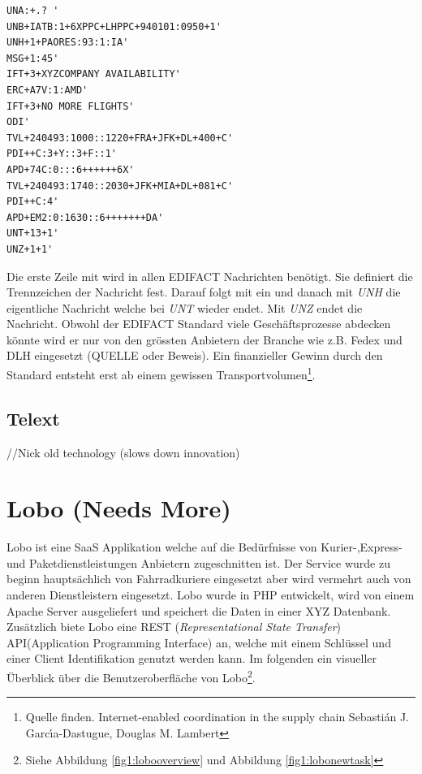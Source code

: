 \begin{verbatim}
UNA:+.? '
UNB+IATB:1+6XPPC+LHPPC+940101:0950+1'
UNH+1+PAORES:93:1:IA'
MSG+1:45'
IFT+3+XYZCOMPANY AVAILABILITY'
ERC+A7V:1:AMD'
IFT+3+NO MORE FLIGHTS'
ODI'
TVL+240493:1000::1220+FRA+JFK+DL+400+C'
PDI++C:3+Y::3+F::1'
APD+74C:0:::6++++++6X'
TVL+240493:1740::2030+JFK+MIA+DL+081+C'
PDI++C:4'
APD+EM2:0:1630::6+++++++DA'
UNT+13+1'
UNZ+1+1'
\end{verbatim}
Die erste Zeile mit  wird in allen EDIFACT Nachrichten benötigt. Sie definiert die Trennzeichen der Nachricht fest. Darauf folgt mit  ein  und danach mit \textit{UNH} die eigentliche Nachricht welche bei \textit{UNT} wieder endet. Mit \textit{UNZ} endet die Nachricht.
\newline{}
Obwohl der EDIFACT Standard viele Geschäftsprozesse abdecken könnte wird er nur von den grössten Anbietern der Branche wie z.B. Fedex und DLH eingesetzt (QUELLE oder Beweis). Ein finanzieller Gewinn durch den Standard entsteht erst ab einem gewissen Transportvolumen\footnote{Quelle finden. Internet-enabled coordination in the supply chain Sebastián J. Garcı́a-Dastugue, Douglas M. Lambert}.

\subsection{Telext}
//Nick old technology (slows down innovation)


\section{Lobo (Needs More)}
Lobo ist eine SaaS Applikation welche auf die Bedürfnisse von Kurier-,Express- und Paketdienstleistungen Anbietern zugeschnitten ist. Der Service wurde zu beginn hauptsächlich von Fahrradkuriere eingesetzt aber wird vermehrt auch von anderen Dienstleistern eingesetzt. Lobo wurde in PHP entwickelt, wird von einem Apache Server ausgeliefert und speichert die Daten in einer XYZ Datenbank. Zusätzlich biete Lobo eine REST (\textit{Representational State Transfer}) API(Application Programming Interface) an, welche mit einem Schlüssel und einer Client Identifikation genutzt werden kann. Im folgenden ein visueller Überblick über die Benutzeroberfläche von Lobo\footnote{Siehe Abbildung \ref{fig1:lobooverview} und Abbildung \ref{fig1:lobonewtask}}.


